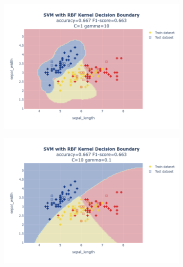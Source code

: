 \documentclass{article}
\begin{document}
\begin{figure}
\begin{subfigure}{0.3\textwidth}
        \includegraphics[scale=.13]{images/implementation/q1/rbf_kernel/sepal_length_sepal_width_1_10.png}
    \end{subfigure}
    \newline
    \begin{subfigure}{0.3\textwidth}
        \centering
        \includegraphics[scale=.13]{images/implementation/q1/rbf_kernel/sepal_length_sepal_width_10_0.1.png}
    \end{subfigure}
    \hfill
    \begin{subfigure}{0.3\textwidth}
        \centering

\end{subfigure}
\end{figure}
\end{document}
